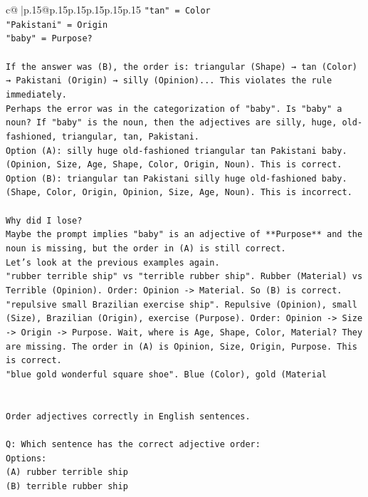 \documentclass{article}
\begin{document}
{\begin{supertabular}{c@{$\;$}|p{.15\linewidth}@{}p{.15\linewidth}p{.15\linewidth}p{.15\linewidth}p{.15\linewidth}p{.15\linewidth}}
{{{\texttt{"tan" = Color} \\
\texttt{"Pakistani" = Origin} \\
\texttt{"baby" = Purpose?} \\
\\ 
\texttt{If the answer was (B), the order is: triangular (Shape) → tan (Color) → Pakistani (Origin) → silly (Opinion)... This violates the rule immediately.} \\
\texttt{Perhaps the error was in the categorization of "baby". Is "baby" a noun? If "baby" is the noun, then the adjectives are silly, huge, old{-}fashioned, triangular, tan, Pakistani.} \\
\texttt{Option (A): silly huge old{-}fashioned triangular tan Pakistani baby. (Opinion, Size, Age, Shape, Color, Origin, Noun). This is correct.} \\
\texttt{Option (B): triangular tan Pakistani silly huge old{-}fashioned baby. (Shape, Color, Origin, Opinion, Size, Age, Noun). This is incorrect.} \\
\\ 
\texttt{Why did I lose?} \\
\texttt{Maybe the prompt implies "baby" is an adjective of **Purpose** and the noun is missing, but the order in (A) is still correct.} \\
\texttt{Let's look at the previous examples again.} \\
\texttt{"rubber terrible ship" vs "terrible rubber ship". Rubber (Material) vs Terrible (Opinion). Order: Opinion {-}> Material. So (B) is correct.} \\
\texttt{"repulsive small Brazilian exercise ship". Repulsive (Opinion), small (Size), Brazilian (Origin), exercise (Purpose). Order: Opinion {-}> Size {-}> Origin {-}> Purpose. Wait, where is Age, Shape, Color, Material? They are missing. The order in (A) is Opinion, Size, Origin, Purpose. This is correct.} \\
\texttt{"blue gold wonderful square shoe". Blue (Color), gold (Material} \\
\\ 
\\ 
\texttt{Order adjectives correctly in English sentences.} \\
\\ 
\texttt{Q: Which sentence has the correct adjective order:} \\
\texttt{Options:} \\
\texttt{(A) rubber terrible ship} \\
\texttt{(B) terrible rubber ship} \\
}}}
\end{supertabular}}
\end{document}
